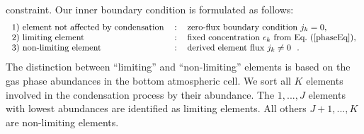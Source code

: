 \documentclass[11pt]{article}
\def\ek{\epsilon_k}
\begin{document}
constraint. Our inner boundary condition is formulated as follows:
\begin{equation}
\mbox{\begin{tabular}{lcl}
  1) element not affected by condensation &:& zero-flux boundary
                                              condition $j_k=0$,\\
  2) limiting element &:& fixed concentration $\ek$ from
            Eq.~(\ref{phaseEq}),\\
  3) non-limiting element &:& derived element flux $j_k\neq0$  \ .
\end{tabular}}
\label{eq:innerBC}
\end{equation}
The distinction between ``limiting'' and ``non-limiting'' elements is
based on the gas phase abundances in the bottom atmospheric cell. We
sort all $K$ elements involved in the condensation process by their
abundance. The $1,...,J$ elements with lowest abundances are
identified as limiting elements. All others $J+1,...,K$ are
non-limiting elements.
\end{document}
